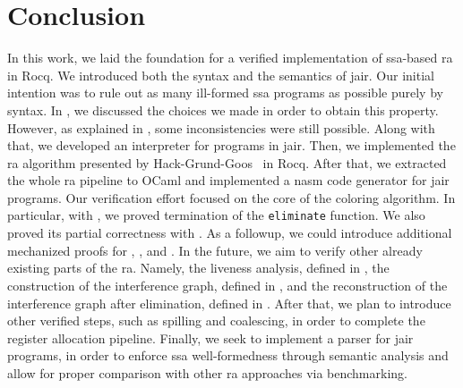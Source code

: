 
\chapter{Conclusion}
\label{cha:conclusion}

In this work, we laid the foundation for a verified implementation of \gls{ssa}-based \gls{ra} in Rocq. We introduced both the syntax and the semantics of \gls{jair}. Our initial intention was to rule out as many ill-formed \gls{ssa} programs as possible purely by syntax. In , we discussed the choices we made in order to obtain this property. However, as explained in , some inconsistencies were still possible. Along with that, we developed an interpreter for programs in \gls{jair}. Then, we implemented the \gls{ra} algorithm presented by Hack-Grund-Goos~\cite{HGG:2006:RA-SSA} in Rocq. After that, we extracted the whole \gls{ra} pipeline to OCaml and implemented a \gls{nasm} code generator for \gls{jair} programs.
Our verification effort focused on the core of the coloring algorithm. In particular, with , we proved termination of the \texttt{eliminate} function. We also proved its partial correctness with . As a followup, we could introduce additional mechanized proofs for , , and . In the future, we aim to verify other already existing parts of the \gls{ra}. Namely, the liveness analysis, defined in , the construction of the interference graph, defined in , and the reconstruction of the interference graph after elimination, defined in . After that, we plan to introduce other verified steps, such as spilling and coalescing, in order to complete the register allocation pipeline. Finally, we seek to implement a parser for \gls{jair} programs, in order to enforce \gls{ssa} well-formedness through semantic analysis and allow for proper comparison with other \gls{ra} approaches via benchmarking.